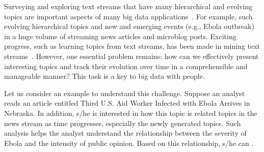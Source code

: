 
Surveying and exploring text streams that have many hierarchical and evolving topics are important aspects of many big data applications~\cite{Chakrabarti2006,Wang2013}.
For example,  such evolving hierarchical topics  and  new and emerging events (e.g., Ebola outbreak) in a huge volume of streaming news articles and microblog posts.
Exciting progress, such as learning topics from text streams, has been made in mining text streams~\cite{ Wang2013}.
However, one essential problem remains: how can we effectively present interesting topics and track their evolution over time in a comprehensible and manageable manner?
This task is a key to  big data with people.

Let us consider an example to understand this challenge.
Suppose an analyst reads an article entitled Third U.S. Aid Worker Infected with Ebola Arrives in Nebraska.
In addition, s/he is interested in how this topic is related  topics in the news stream as time progresses, especially the newly generated topics.
Such analysis helps the analyst understand the relationship between the severity of Ebola and the intensity of public opinion.
Based on this relationship, s/he can .

